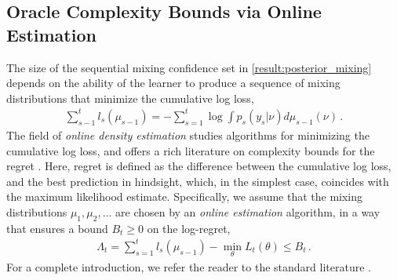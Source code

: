 

\subsection{Oracle Complexity Bounds via Online Estimation}\label{sec:oco}

The size of the sequential mixing confidence set in \cref{result:posterior_mixing} depends on the ability of the learner to produce a sequence of mixing distributions that minimize the cumulative log loss,
\begin{align*}
   \sum_{s-1}^t l_s(\mu_{s-1}) =  - \sum_{s=1}^t \log \int p_s(y_s|\nu) d\mu_{s-1}(\nu) \,.
\end{align*}
The field of \emph{online density estimation} studies algorithms for minimizing the cumulative log loss, and offers a rich literature on complexity bounds for the regret \citep[e.g.,][]{vovk1990aggregating,vovk1997competitive,zhang2006varepsilon,rakhlin2014online}. Here, regret is defined as the difference between the cumulative log loss, and the best prediction in hindsight, which, in the simplest case, coincides with the maximum likelihood estimate. Specifically, we assume that the mixing distributions $\mu_1, \mu_2, \dots$ are chosen by an \emph{online estimation} algorithm, in a way that ensures a bound $B_t \geq 0$ on the log-regret,
\begin{align*}
    \Lambda_t = \sum_{s=1}^t l_s(\mu_{s-1}) - \min_{\theta} L_t(\theta) \leq B_t \,.
\end{align*}
For a complete introduction, we refer the reader to the standard literature \citep[e.g.,][]{cesa2006prediction,orabona2019modern,shalev2012online}. 

